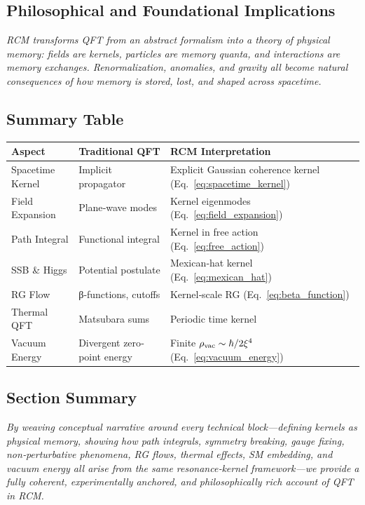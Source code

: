 \subsection{Philosophical and Foundational Implications}

\textit{RCM transforms QFT from an abstract formalism into a theory of physical memory: fields are kernels, particles are memory quanta, and interactions are memory exchanges.  Renormalization, anomalies, and gravity all become natural consequences of how memory is stored, lost, and shaped across spacetime.}

\subsection{Summary Table}

\begin{center}
\begin{tabular}{|l|l|l|}
\hline
\textbf{Aspect}         & \textbf{Traditional QFT}    & \textbf{RCM Interpretation}               \\ \hline
Spacetime Kernel        & Implicit propagator         & Explicit Gaussian coherence kernel (Eq.~\ref{eq:spacetime_kernel}) \\ \hline
Field Expansion         & Plane‐wave modes            & Kernel eigenmodes (Eq.~\ref{eq:field_expansion}) \\ \hline
Path Integral           & Functional integral         & Kernel in free action (Eq.~\ref{eq:free_action}) \\ \hline
SSB \& Higgs            & Potential postulate         & Mexican‐hat kernel (Eq.~\ref{eq:mexican_hat}) \\ \hline
RG Flow                 & β‐functions, cutoffs        & Kernel‐scale RG (Eq.~\ref{eq:beta_function}) \\ \hline
Thermal QFT             & Matsubara sums              & Periodic time kernel \\ \hline
Vacuum Energy           & Divergent zero‐point energy & Finite $\rho_{\rm vac}\sim\hbar/2\xi^4$ (Eq.~\ref{eq:vacuum_energy}) \\ \hline
\end{tabular}
\end{center}

\subsection{Section Summary}

\textit{By weaving conceptual narrative around every technical block—defining kernels as physical memory, showing how path integrals, symmetry breaking, gauge fixing, non‐perturbative phenomena, RG flows, thermal effects, SM embedding, and vacuum energy all arise from the same resonance‐kernel framework—we provide a fully coherent, experimentally anchored, and philosophically rich account of QFT in RCM.} 

